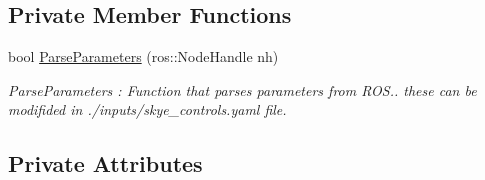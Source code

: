 \subsection*{Private Member Functions}
\begin{DoxyCompactItemize}
\item 
bool \hyperlink{class_pose_controller_node_ac1fe656c0f8df15dd3a78f12a57d04fa}{Parse\-Parameters} (ros\-::\-Node\-Handle nh)
\begin{DoxyCompactList}\small\item\em Parse\-Parameters \-: Function that parses parameters from R\-O\-S.. these can be modifided in ./inputs/skye\-\_\-controls.yaml file. \end{DoxyCompactList}\end{DoxyCompactItemize}
\subsection*{Private Attributes}
